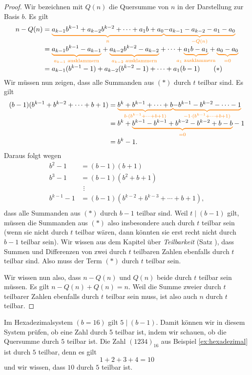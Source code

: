 \documentclass[../../main.tex]{subfiles}
\begin{document}
\begin{proof}
    Wir bezeichnen mit $Q(n)$ die Quersumme von $n$ in der Darstellung zur Basis $b$. Es gilt
    \begin{align*}
        n-Q(n)&=\colorbrace{a_{k-1}b^{k-1}+a_{k-2}b^{k-2}+\dots+a_1b+a_0}{n}\colorbrace{-a_{k-1}-a_{k-2}-a_1-a_0}{-Q(n)}\\
        &=\colorbrace{a_{k-1}b^{k-1}-a_{k-1}}{a_{k-1}\text{ ausklammern}}+\colorbrace{a_{k-2}b^{k-2}-a_{k-2}}{a_{k-2}\text{ ausklammern}}+\dots+\colorbrace{a_1b-a_1}{a_1\text{ ausklammern}}+\colorbrace{a_0-a_0}{=0}\\
        &=a_{k-1}(b^{k-1}-1)+a_{k-2}(b^{k-2}-1)+\dots+a_1(b-1)\tag{$*$}
    \end{align*}
    Wir müssen nun zeigen, dass alle Summanden aus $(*)$ durch $t$ teilbar sind. Es gilt
    \begin{align*}
        (b-1)(b^{k-1}+b^{k-2}+\cdots+b+1)
        &=\colorbrace{b^k+b^{k-1}+\cdots+b}{b\cdot(b^{k-1}+\cdots+b+1)}\colorbrace{-b^{k-1}-b^{k-2}-\cdots-1}{-1\cdot(b^{k-1}+\cdots+b+1)}\\
        &=b^k+\colorbrace{b^{k-1}-b^{k-1}+b^{k-2}-b^{k-2}+b-b}{=0}-1\\
        &=b^k-1.
    \end{align*}
    Daraus folgt wegen
    \begin{align*}
        b^2-1&=(b-1)(b+1)\\
        b^3-1&=(b-1)(b^2+b+1)\\
        &~\,\vdots\\
        b^{k-1}-1&=(b-1)(b^{k-2}+b^{k-3}+\cdots+b+1),\\
    \end{align*}
    dass alle Summanden aus $(*)$ durch $b-1$ teilbar sind. Weil $t\mid(b-1)$ gilt, müssen die Summanden aus $(*)$ also insbesondere auch durch $t$ teilbar sein (wenn sie nicht durch $t$ teilbar wären, dann könnten sie erst recht nicht durch $b-1$ teilbar sein). Wir wissen aus dem Kapitel über \emph{Teilbarkeit} (Satz \mayberef), dass Summen und Differenzen von zwei durch $t$ teilbaren Zahlen ebenfalls durch $t$ teilbar sind. Also muss der Term $(*)$ durch $t$ teilbar sein. 
    
    Wir wissen nun also, dass $n-Q(n)$ und $Q(n)$ beide durch $t$ teilbar sein müssen. Es gilt $n-Q(n)+Q(n)=n$. Weil die Summe zweier durch $t$ teilbarer Zahlen ebenfalls durch $t$ teilbar sein muss, ist also auch $n$ durch $t$ teilbar.
\end{proof}
\begin{example}{}
    Im Hexadezimalsystem $(b=16)$ gilt $5\mid(b-1)$. Damit können wir in diesem System prüfen, ob eine Zahl durch 5 teilbar ist, indem wir schauen, ob die Quersumme durch $5$ teilbar ist. Die Zahl $(1234)_{16}$ aus Beispiel \ref{ex:hexadezimal} ist durch $5$ teilbar, denn es gilt
    \[1+2+3+4=10\]
    und wir wissen, dass $10$ durch $5$ teilbar ist.
\end{example}
\end{document}
